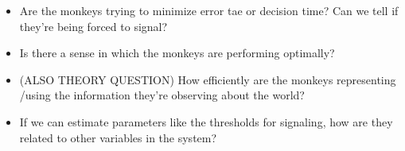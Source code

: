 \documentclass{article}
\begin{document}
\begin{itemize}
\begin{itemize}
	\item Are the monkeys trying to minimize error tae or decision time? Can we tell if they're being forced to signal?
	\item Is there a sense in which the monkeys are performing optimally? 
	\item (ALSO THEORY QUESTION) How efficiently are the monkeys representing /using the information they're observing about the world?
	\item If we can estimate parameters like the thresholds for signaling, how are they related to other variables in the system?
	\end{itemize}
\end{itemize}



\nocite{*}


\end{document}
